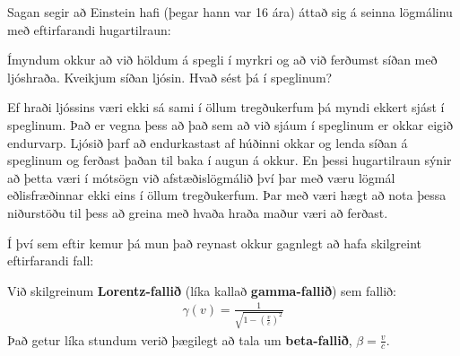 \vspace{0.1cm}

Sagan segir að Einstein hafi (þegar hann var 16 ára) áttað sig á seinna lögmálinu með eftirfarandi hugartilraun:

\vspace{0.1cm}

Ímyndum okkur að við höldum á spegli í myrkri og að við ferðumst síðan með ljóshraða. Kveikjum síðan ljósin. Hvað sést þá í speglinum?

\vspace{0.1cm}

Ef hraði ljóssins væri ekki sá sami í öllum tregðukerfum þá myndi ekkert sjást í speglinum. Það er vegna þess að það sem að við sjáum í speglinum er okkar eigið endurvarp. Ljósið þarf að endurkastast af húðinni okkar og lenda síðan á speglinum og ferðast þaðan til baka í augun á okkur. En þessi hugartilraun sýnir að þetta væri í mótsögn við afstæðislögmálið því þar með væru lögmál eðlisfræðinnar ekki eins í öllum tregðukerfum. Þar með væri hægt að nota þessa niðurstöðu til þess að greina með hvaða hraða maður væri að ferðast.

\vspace{0.1cm}

Í því sem eftir kemur þá mun það reynast okkur gagnlegt að hafa skilgreint eftirfarandi fall:

\begin{tcolorbox}
\begin{definition}
Við skilgreinum \textbf{Lorentz-fallið} (líka kallað \textbf{gamma-fallið}) sem fallið:
\begin{align*}
    \gamma(v) = \frac{1}{\sqrt{1 - \left(\frac{v}{c}\right)^2}}
\end{align*}
Það getur líka stundum verið þægilegt að tala um \textbf{beta-fallið}, $\beta = \frac{v}{c}$.
\end{definition}
\end{tcolorbox}


